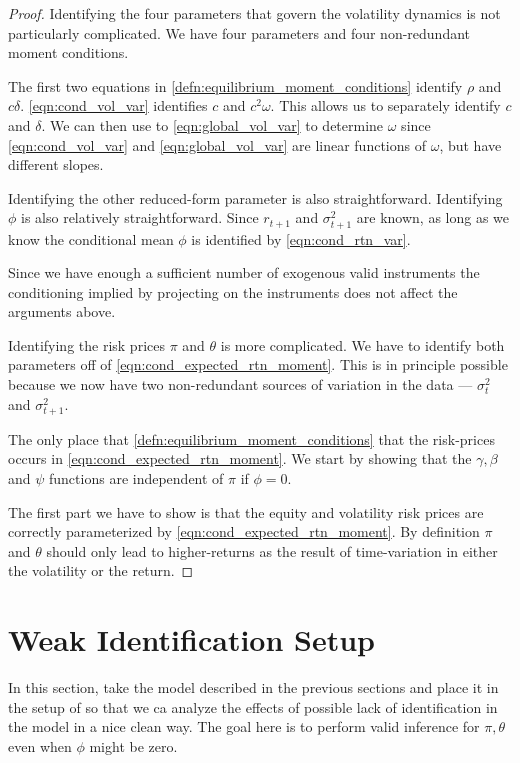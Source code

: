 \documentclass[11pt, letterpaper, twoside, final]{article}
\begin{document}
\begin{proof}
    Identifying the four parameters that govern the volatility dynamics is not particularly complicated. 
    We have four parameters and four non-redundant moment conditions.

    The first two equations in    \cref{defn:equilibrium_moment_conditions} identify $\rho$ and $c \delta$.
    \cref{eqn:cond_vol_var} identifies $c$ and $c^2 \omega$. 
    This allows us to separately identify $c$ and $\delta$.
    We can then use to  \cref{eqn:global_vol_var} to determine $\omega$ since \cref{eqn:cond_vol_var} and
    \cref{eqn:global_vol_var} are linear functions of $\omega$, but have different slopes. 
    
    Identifying the other reduced-form parameter is also straightforward. 
    Identifying $\phi$ is also relatively straightforward. Since $r_{t+1}$ and $\sigma^2_{t+1}$ are known, as long
    as we know the conditional mean $\phi$ is identified by \cref{eqn:cond_rtn_var}.
    
    Since we have enough a sufficient number of exogenous valid instruments the conditioning implied by projecting
    on the instruments does not affect the arguments above. 

    Identifying the risk prices $\pi$ and $\theta$ is more complicated.
    We have to identify both parameters off of \cref{eqn:cond_expected_rtn_moment}. 
    This is in principle possible because we now have two non-redundant sources of variation in the data ---
    $\sigma^2_t$ and $\sigma^2_{t+1}$.

    The only place that \cref{defn:equilibrium_moment_conditions} that the risk-prices occurs in
    \cref{eqn:cond_expected_rtn_moment}. 
    We start by showing that the $\gamma, \beta$ and $\psi$ functions are independent of $\pi$ if $\phi = 0$.
    

    The first part we have to show is that the equity and volatility risk prices are correctly parameterized by
    \cref{eqn:cond_expected_rtn_moment}.
    By definition $\pi$ and $\theta$ should only lead to higher-returns as the result of time-variation in either
    the volatility or the return.
    
\end{proof}


\section{Weak Identification Setup}

In this section, take the model described in the previous sections and place it in the setup of
\textcite{andrews2014Gmm} so that we ca analyze the effects of possible lack of identification in the model in a
nice clean way.
The goal here is to perform valid inference for $\pi, \theta$ even when $\phi$ might be zero. 
\end{document}
